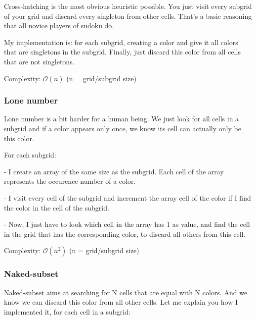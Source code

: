 \documentclass{article}
\begin{document}
Cross-hatching is the most obvious heuristic possible. You just visit every subgrid of your grid and discard every singleton from other cells. That's a basic reasoning that all novice players of sudoku do.

\vspace{1\baselineskip}

My implementation is: for each subgrid, creating a color and give it all colors that are singletons in the subgrid. Finally, just discard this color from all cells that are not singletons.

\vspace{1\baselineskip}
Complexity: $\mathcal{O}(n)$ (n = grid/subgrid size)

\subsubsection{Lone number}

Lone number is a bit harder for a human being. We just look for all cells in a subgrid and if a color appears only once, we know its cell can actually only be this color.

For each subgrid:

\vspace{1\baselineskip}
- I create an array of the same size as the subgrid. Each cell of the array represents the occurence number of a color.

\vspace{1\baselineskip}
- I visit every cell of the subgrid and increment the array cell of the color if I find the color in the cell of the subgrid.

\vspace{1\baselineskip}
- Now, I just have to look which cell in the array has 1 as value, and find the cell in the grid that has the corresponding color, to discard all others from this cell.

\vspace{1\baselineskip}
Complexity: $\mathcal{O}(n^2)$ (n = grid/subgrid size)

\subsubsection{Naked-subset}

Naked-subset aims at searching for N cells that are equal with N colors. And we know we can discard this color from all other cells.
Let me explain you how I implemented it, for each cell in a subgrid:
\end{document}
